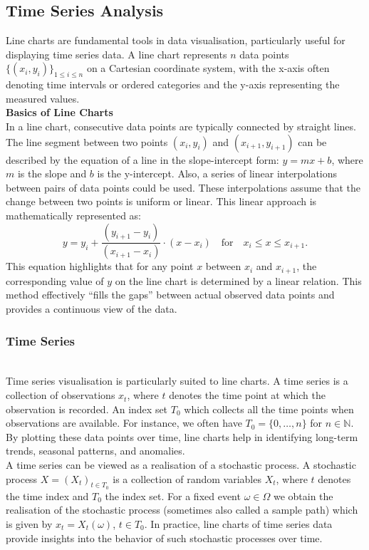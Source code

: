 \documentclass{article}\usepackage[]{graphicx}\usepackage[]{xcolor}
\numberwithin{equation}{section}
\begin{document}
\subsection{Time Series Analysis}

\noindent
Line charts are fundamental tools in data visualisation, particularly useful for displaying time series data. A line chart represents $n$ data points 
$\{(x_i,y_i)\}_{1 \leq i \leq n}$ on a Cartesian coordinate system, with the x-axis often denoting time intervals or ordered categories and the y-axis representing the measured values.\\ 

\noindent 
\textbf{Basics of Line Charts}\\
\noindent
In a line chart, consecutive data points are typically connected by straight lines. The line segment between two points \((x_i,y_i)\) and \((x_{i+1},y_{i+1})\) can be described by the equation of a line in the slope-intercept form: \(y=mx+b\), where \(m\) is the slope and \(b\) is the y-intercept. Also, a series of linear interpolations between pairs of data points could be used. These interpolations assume that the change between two points is uniform or linear. This linear approach is mathematically represented as:
\[
y = y_i + \frac{(y_{i+1} - y_i)}{(x_{i+1} - x_i)} \cdot (x - x_i) \quad \text{for} \quad x_i \leq x \leq x_{i+1}.
\]
\noindent
This equation highlights that for any point \(x\) between \(x_i\) and \(x_{i+1}\), the corresponding value of \(y\) on the line chart is determined by a linear relation. This method effectively ``fills the gaps'' between actual observed data points and provides a continuous view of the data.

\subsubsection{Time Series}\\
\noindent
Time series visualisation is particularly suited to line charts. A time series is a collection of observations $x_t$, where $t$ denotes the time point at which the observation is recorded. An index set $T_0$ which collects all the time points when observations are available. For instance, we often have $T_0 = \{0,\dots ,n\}$ for $n \in \mathbb{N}$. By plotting these data points over time, line charts help in identifying long-term trends, seasonal patterns, and anomalies.\\

\noindent
A time series can be viewed as a realisation of a stochastic process. A stochastic process \cite{Brockwell2016Introduction} $X = (X_t)_{t \in T_0}$ is a collection of random variables $X_t$, where $t$ denotes the time index and $T_0$ the index set. For a fixed event $\omega \in \Omega$ we obtain the realisation of the stochastic process (sometimes also called a sample path) which is given by $x_t = X_t(\omega)$, $t \in T_0$. In practice, line charts of time series data provide insights into the behavior of such stochastic processes over time.\\
\end{document}
